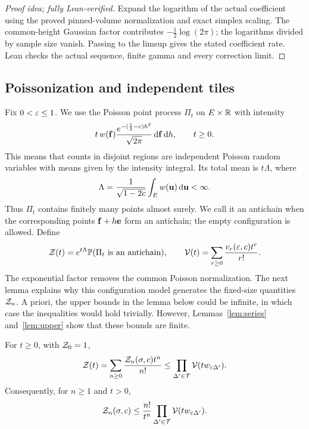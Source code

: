\documentclass[11pt,letterpaper]{article}
\begin{document}
\begin{proof}[Proof idea; fully Lean-verified]
Expand the logarithm of the actual coefficient using the proved pinned-volume normalization and exact simplex scaling. The common-height Gaussian factor contributes $-\tfrac12\log(2\pi)$; the logarithms divided by sample size vanish. Passing to the limsup gives the stated coefficient rate. Lean checks the actual sequence, finite gamma and every correction limit.
\end{proof}

\subsection{Poissonization and independent tiles}

Fix $0<\varepsilon\le1$. We use the Poisson point process $\Pi_t$ on $E\times\mathbb R$ with intensity
\[
      t\,w(\mathbf f)\frac{e^{-(\frac12-c)h^2}}{\sqrt{2\pi}}\,\mathrm d\mathbf f\,\mathrm d h,
      \qquad t\ge0.
\]
This means that counts in disjoint regions are independent Poisson random variables with means given by the intensity integral. Its total mean is $t\Lambda$, where
\begin{equation}\label{eq:poisson-mass}
      \Lambda=\frac1{\sqrt{1-2c}}\int_Ew(\mathbf u)\,\mathrm d\mathbf u<\infty.
\end{equation}
Thus $\Pi_t$ contains finitely many points almost surely. We call it an antichain when the corresponding points $\mathbf f+h\mathbf e$ form an antichain; the empty configuration is allowed. Define
\[
      \mathcal Z(t)=e^{t\Lambda}\mathbb P(\Pi_t\text{ is an antichain}),
      \qquad \mathcal V(t)=\sum_{r\ge0}\frac{v_r(\varepsilon,c)t^r}{r!}.
\]
The exponential factor removes the common Poisson normalization.
The next lemma explains why this configuration model generates the fixed-size quantities $\mathcal Z_n$. A priori, the upper bounds in the lemma below could be infinite, in which case the inequalities would hold trivially. However, Lemmas~\ref{lem:series} and~\ref{lem:upper} show that these bounds are finite.

\begin{lemma}\label{lem:tile-product}
      For $t\ge0$, with $\mathcal Z_0=1$,
      \begin{equation}\label{eq:poissonization}
            \mathcal Z(t)=\sum_{n\ge0}\frac{\mathcal Z_n(\sigma,c)t^n}{n!}
            \le\prod_{\Delta'\in\mathcal T}\mathcal V(tw_{\varepsilon\Delta'}).
      \end{equation}
      Consequently, for $n\ge1$ and $t>0$,
      \begin{equation}\label{eq:occupancy}
            \mathcal Z_n(\sigma,c)\le \frac{n!}{t^{n}}\prod_{\Delta'\in\mathcal T}\mathcal V(tw_{\varepsilon\Delta'}).
      \end{equation}
\end{lemma}
\end{document}
